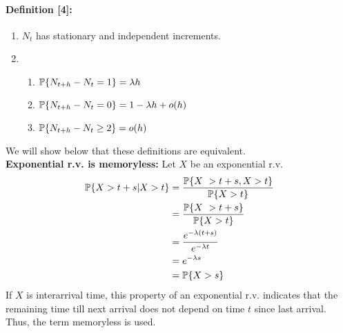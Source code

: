 \documentclass[all-lectures.tex]{subfiles}
\begin{document}
\paragraph{Definition [4]:}{
\begin{enumerate}
\item $N_t$ has stationary and independent increments.
\item \begin{enumerate}
\item $\P\{N_{t+h} - N_{t}  = 1 \}= \lambda h$
\item $\P\{N_{t+h} - N_{t}  = 0 \}= 1 - \lambda h + o(h)$
\item $\P\{N_{t+h} - N_{t}  \geq 2 \}= o(h)$
\end{enumerate}
\end{enumerate}
}
We will show below that these definitions are equivalent.\\
\textbf{Exponential r.v. is memoryless:} Let $X$ be an exponential r.v.
\begin{align*}
\P\{X > t+s|X>t\} &= \frac{\P\{X\ > t+s,X>t\}}{\P\{X>t\}} \\
&= \frac{\P\{X\ > t+s\}}{\P\{X>t\}} \\
&= \frac{e^{-\lambda (t+s)}}{e^{-\lambda t}} \\
&= e^{-\lambda s} \\
&= \P\{X > s\} 
\end{align*}
If $X$ is interarrival time, this property of an exponential r.v. indicates that the remaining time till next arrival does not depend on time $t$ since last arrival. Thus, the term memoryless is used.
\end{document}
